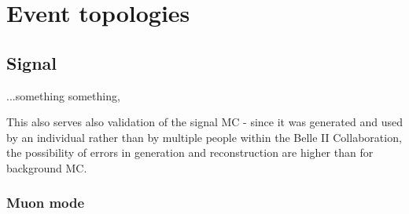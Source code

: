\documentclass[12pt,a4paper]{article} %
\begin{document}
\section{Event topologies}

\subsection{Signal}

...something something, 

This also serves also validation of the signal MC - since it was generated and used by an individual rather than by multiple people within the Belle II Collaboration, the possibility of errors in generation and reconstruction are higher than for background MC. 


\subsubsection{Muon mode}
\end{document}
